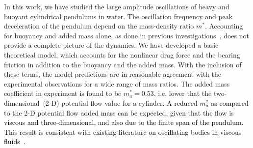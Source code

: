 \documentclass{jfm}
\begin{document}
In this work, we have studied  the large amplitude oscillations of heavy and buoyant cylindrical pendulums in water.  The oscillation frequency and peak deceleration of the pendulum depend on the mass-density ratio $m^*$. Accounting for buoyancy and added mass alone, as done in previous investigations~\citep{neill2007pendulum}, does not  provide a complete picture of the dynamics.  We have developed a basic theoretical model, which accounts for  the nonlinear drag force and the bearing friction in addition to the buoyancy and the added mass. 
With the inclusion of these terms, the model predictions are in reasonable agreement with the experimental observations for a wide range of mass ratios. The added mass coefficient in experiment is found to be $m_a^* = 0.53$, i.e. lower that the two-dimensional~(2-D) potential flow value for a cylinder. \textcolor{black}{A reduced $m_a^*$ as compared to the 2-D potential flow added mass can be expected, given that the flow is viscous and three-dimensional, and also due to the finite span of the pendulum.  This result is consistent with existing literature on oscillating bodies in viscous fluids~\citep{dong1978effective,konstantinidis2013added,koo2015simplified}.}
\end{document}
